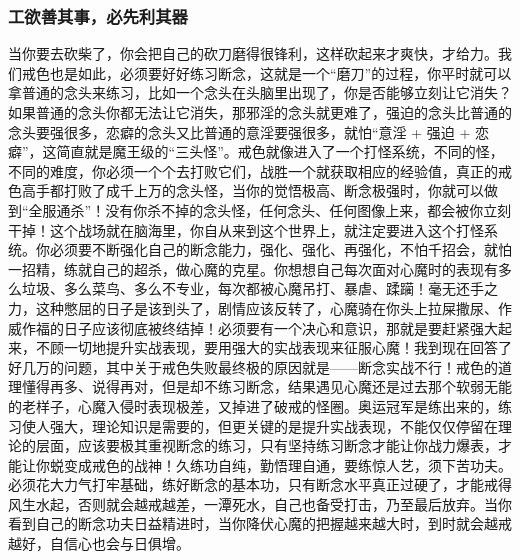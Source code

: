 \subsubsection{工欲善其事，必先利其器}

当你要去砍柴了，你会把自己的砍刀磨得很锋利，这样砍起来才爽快，才给力。我们戒色也是如此，必须要好好练习断念，这就是一个“磨刀”的过程，你平时就可以拿普通的念头来练习，比如一个念头在头脑里出现了，你是否能够立刻让它消失？如果普通的念头你都无法让它消失，那邪淫的念头就更难了，强迫的念头比普通的念头要强很多，恋癖的念头又比普通的意淫要强很多，就怕“意淫 + 强迫 + 恋癖”，这简直就是魔王级的“三头怪”。戒色就像进入了一个打怪系统，不同的怪，不同的难度，你必须一个个去打败它们，战胜一个就获取相应的经验值，真正的戒色高手都打败了成千上万的念头怪，当你的觉悟极高、断念极强时，你就可以做到“全服通杀”！没有你杀不掉的念头怪，任何念头、任何图像上来，都会被你立刻干掉！这个战场就在脑海里，你自从来到这个世界上，就注定要进入这个打怪系统。你必须要不断强化自己的断念能力，强化、强化、再强化，不怕千招会，就怕一招精，练就自己的超杀，做心魔的克星。你想想自己每次面对心魔时的表现有多么垃圾、多么菜鸟、多么不专业，每次都被心魔吊打、暴虐、蹂躏！毫无还手之力，这种憋屈的日子是该到头了，剧情应该反转了，心魔骑在你头上拉屎撒尿、作威作福的日子应该彻底被终结掉！必须要有一个决心和意识，那就是要赶紧强大起来，不顾一切地提升实战表现，要用强大的实战表现来征服心魔！我到现在回答了好几万的问题，其中关于戒色失败最终极的原因就是——断念实战不行！戒色的道理懂得再多、说得再对，但是却不练习断念，结果遇见心魔还是过去那个软弱无能的老样子，心魔入侵时表现极差，又掉进了破戒的怪圈。奥运冠军是练出来的，练习使人强大，理论知识是需要的，但更关键的是提升实战表现，不能仅仅停留在理论的层面，应该要极其重视断念的练习，只有坚持练习断念才能让你战力爆表，才能让你蜕变成戒色的战神！久练功自纯，勤悟理自通，要练惊人艺，须下苦功夫。必须花大力气打牢基础，练好断念的基本功，只有断念水平真正过硬了，才能戒得风生水起，否则就会越戒越差，一潭死水，自己也备受打击，乃至最后放弃。当你看到自己的断念功夫日益精进时，当你降伏心魔的把握越来越大时，到时就会越戒越好，自信心也会与日俱增。

